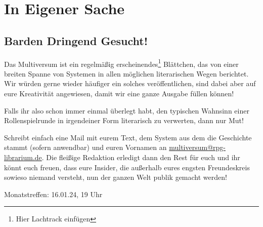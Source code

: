 \documentclass[final]{multiversum}
\begin{document}
\section{In Eigener Sache}
\subsection{Barden Dringend Gesucht!}
Das Multiversum ist ein regelmäßig erscheinendes\footnote{Hier Lachtrack
einfügen} Blättchen, das von einer breiten Spanne von Systemen in allen
möglichen literarischen Wegen berichtet. Wir würden gerne wieder häufiger
ein solches veröffentlichen, sind dabei aber auf eure Kreativität angewiesen,
damit wir eine ganze Ausgabe füllen können!

Falls ihr also schon immer einmal überlegt habt, den typischen Wahnsinn einer
Rollenspielrunde in irgendeiner Form literarisch zu verwerten, dann nur Mut!

Schreibt einfach eine Mail mit eurem Text, dem System aus dem die Geschichte
stammt (sofern anwendbar) und euren Vornamen an
\url{multiversum@rpg-librarium.de}. Die fleißige Redaktion erledigt dann den
Rest für euch und ihr könnt euch freuen, dass eure Insider, die außerhalb eures
engsten Freundeskreis sowieso niemand versteht, nun der ganzen Welt publik
gemacht werden!



\begin{termine}
\item Monatstreffen: 16.01.24, 19 Uhr
\end{termine}
\impressum
\end{document}
